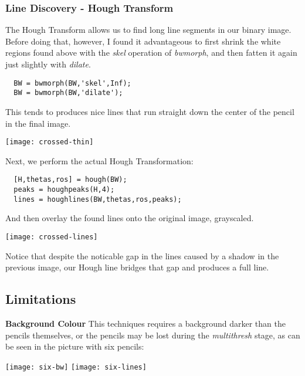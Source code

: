 \documentclass{article}
\begin{document}
\subsubsection{Line Discovery - Hough Transform}
The Hough Transform allows us to find long line segments in our
binary image. Before doing that, however, I found it advantageous to first
shrink the white regions found above with the \emph{skel} operation of
\emph{bwmorph}, and then fatten it again just slightly with \emph{dilate}.

\begin{lstlisting}
  BW = bwmorph(BW,'skel',Inf);
  BW = bwmorph(BW,'dilate');
\end{lstlisting}

This tends to produces nice lines that run straight down the center of
the pencil in the final image.\\

\begin{center}
  \texttt{[image: crossed-thin]}  
\end{center}

Next, we perform the actual Hough Transformation:

\begin{lstlisting}
  [H,thetas,ros] = hough(BW);
  peaks = houghpeaks(H,4);
  lines = houghlines(BW,thetas,ros,peaks);
\end{lstlisting}

And then overlay the found lines onto the original image, grayscaled.

\begin{center}
  \texttt{[image: crossed-lines]}
\end{center}

Notice that despite the noticable gap in the lines caused by a shadow in the
previous image, our Hough line bridges that gap and produces a full line.

\subsection{Limitations}
\textbf{Background Colour} This techniques requires a background darker than
the pencils themselves, or the pencils may be lost during the
\emph{multithresh} stage, as can be seen in the picture with six pencils:

\begin{center}
  \texttt{[image: six-bw]}
  \texttt{[image: six-lines]}
\end{center}
\end{document}
